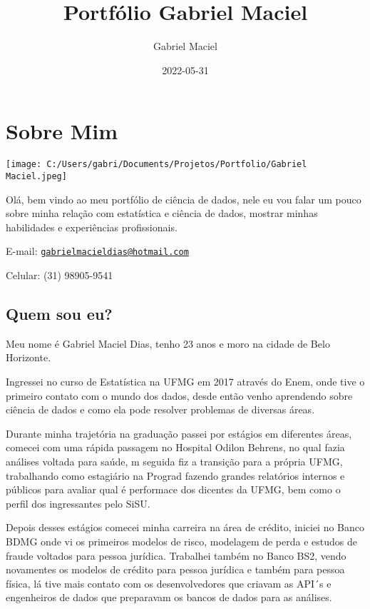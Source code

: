 \documentclass[
]{book}
\title{Portfólio Gabriel Maciel}
\author{Gabriel Maciel}
\date{2022-05-31}
\begin{document}
\maketitle

{
\setcounter{tocdepth}{1}
\tableofcontents
}
\hypertarget{sobre-mim}{%
\chapter{Sobre Mim}\label{sobre-mim}}

\texttt{[image: C:/Users/gabri/Documents/Projetos/Portfolio/Gabriel Maciel.jpeg]}

Olá, bem vindo ao meu portfólio de ciência de dados, nele eu vou falar um pouco sobre minha relação com estatística e ciência de dados, mostrar minhas habilidades e experiências profissionais.

E-mail: \href{mailto:gabrielmacieldias@hotmail.com}{\nolinkurl{gabrielmacieldias@hotmail.com}}

Celular: (31) 98905-9541

\hypertarget{quem-sou-eu}{%
\section{Quem sou eu?}\label{quem-sou-eu}}

Meu nome é Gabriel Maciel Dias, tenho 23 anos e moro na cidade de Belo Horizonte.

Ingressei no curso de Estatística na UFMG em 2017 através do Enem, onde tive o primeiro contato com o mundo dos dados, desde então venho aprendendo sobre ciência de dados e como ela pode resolver problemas de diversas áreas.

Durante minha trajetória na graduação passei por estágios em diferentes áreas, comecei com uma rápida passagem no Hospital Odilon Behrens, no qual fazia análises voltada para saúde, m seguida fiz a transição para a própria UFMG, trabalhando como estagiário na Prograd fazendo grandes relatórios internos e públicos para avaliar qual é performace dos dicentes da UFMG, bem como o perfil dos ingressantes pelo SiSU.

Depois desses estágios comecei minha carreira na área de crédito, iniciei no Banco BDMG onde vi os primeiros modelos de risco, modelagem de perda e estudos de fraude voltados para pessoa jurídica. Trabalhei também no Banco BS2, vendo novamentes os modelos de crédito para pessoa jurídica e também para pessoa física, lá tive mais contato com os desenvolvedores que criavam as API´s e engenheiros de dados que preparavam os bancos de dados para as análises.
\end{document}
